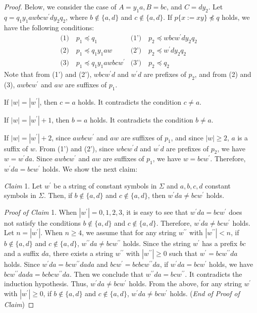 \begin{proof}
  Below, we consider the case of $A=y_{1}a,B=bc$, and $C=dy_{2}$.
  Let $q=q_{1}y_{1}awbcw^{\prime}dy_{2}q_{2}$, where $b \not\in \{a,d\}$ and $c \not\in \{a,d\}$.
  If $p \{ x := xy \} \not \preceq q$ holds, we have the following conditions:
  \begin{align*}
    \textrm{(1)}~& p_{1} \preceq q_{1} & \textrm{(1')}~& p_{2} \preceq wbcw^{\prime}dy_{2}q_{2} \\
    \textrm{(2)}~& p_{1} \preceq q_{1}y_{1}aw & \textrm{(2')}~& p_{2} \preceq w^{\prime}dy_{2}q_{2} \\
    \textrm{(3)}~& p_{1} \preceq q_{1}y_{1}awbcw^{\prime} & \textrm{(3')}~& p_{2} \preceq q_{2}
  \end{align*}
  Note that from (1') and (2'), $wbcw^{\prime}d$ and $w^{\prime}d$ are prefixes of $p_{2}$, and from (2) and (3), $awbcw^{\prime}$ and $aw$ are suffixes of $p_{1}$.

  If $|w|=|w^{\prime}|$, then $c=a$ holds.
  It contradicts the condition $c \not = a$.
  
  If $|w|=|w^{\prime}|+1$, then $b = a$ holds.
  It contradicts the condition $b \not = a$.
  
  If $|w| = |w^{\prime}|+2$, since $awbcw^{\prime}$ and $aw$ are suffixes of $p_{1}$, and since $|w|\geq 2$, $a$ is a suffix of $w$.
  From (1') and (2'), since $wbcw^{\prime}d$ and $w^{\prime}d$ are prefixes of $p_{2}$, we have $w=w^{\prime}da$.
  Since $awbcw^{\prime}$ and $aw$ are suffixes of $p_{1}$, we have $w=bcw^{\prime}$.
  Therefore, $w^{\prime}da = bcw^{\prime}$ holds. We show the next claim:

  \smallskip

  \noindent
  \textit{Claim} 1.
  Let $w^{\prime}$ be a string of constant symbols in $\Sigma$ and $a,b,c,d$ constant symbols in $\Sigma$.
  Then, if $b \not\in \{a,d\}$ and $c \not\in \{a,d\}$, then $w^{\prime}da \not = bcw^{\prime}$ holds.

  \smallskip
  
  \noindent
  \textit{Proof of Claim} 1.
  When $|w^{\prime}| = 0, 1, 2, 3$, it is easy to see that $w^{\prime}da=bcw^{\prime}$ does not satisfy the conditions $b \not\in \{a,d\}$ and $c \not\in \{a,d\}$. Therefore, $w^{\prime}da \not= bcw^{\prime}$ holds.
  Let $n = |w^{\prime}|$.
  When $n \ge 4$, we assume that for any string $w^{\prime\prime}$ with $|w^{\prime\prime}|<n$, if $b \not\in \{a,d\}$ and $c \not\in \{a,d\}$, $w^{\prime\prime}da \not =bcw^{\prime\prime}$ holds.
  Since the string $w^{\prime}$ has a prefix $bc$ and a suffix $da$, there exists a string $w^{\prime\prime}$ with $|w^{\prime\prime}| \geq 0$ such that $w^{\prime}=bcw^{\prime\prime}da$ holds.
  Since $w^{\prime}da=bcw^{\prime\prime}dada$ and $bcw^{\prime}=bcbcw^{\prime\prime}da$, if $w^{\prime}da = bcw^{\prime}$ holds, we have $bcw^{\prime\prime}dada=bcbcw^{\prime\prime}da$.
  Then we conclude that $w^{\prime\prime}da=bcw^{\prime\prime}$.
  It contradicts the induction hypothesis. Thus, $w^{\prime}da \not= bcw^{\prime}$ holds.
  From the above, for any string $w^{\prime}$ with $|w^{\prime}| \geq 0$, if $b \not\in \{a,d\}$ and $c \not\in \{a,d\}$, $w^{\prime}da \not =bcw^{\prime}$ holds.
  (\textit{End of Proof of Claim})
  

\end{proof}

